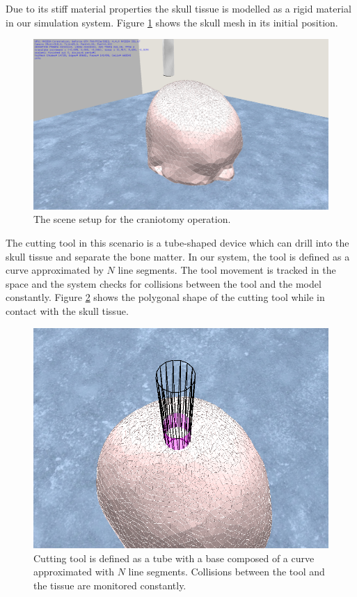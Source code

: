 Due to its stiff material properties the skull tissue is modelled as a rigid material in our simulation system. 
Figure \ref{fig:craniotomy01} shows the skull mesh in its initial position.

\begin{figure}[H]
  \centering
  \includegraphics[width=0.7\linewidth]{figures/evaluation/craniotomy01.png}
  \caption{\label{fig:craniotomy01}
  {The scene setup for the craniotomy operation.}
}
\end{figure}


The cutting tool in this scenario is a tube-shaped device which can drill into the skull tissue and separate the bone matter.
In our system, the tool is defined as a curve approximated by $N$ line segments. The tool movement is tracked in the space 
and the system checks for collisions between the tool and the model constantly. Figure \ref{fig:craniotomytube} shows the 
polygonal shape of the cutting tool while in contact with the skull tissue.

\begin{figure}[H]
  \centering
  \includegraphics[width=0.6\linewidth]{figures/evaluation/craniotomytube.png}
  \caption{\label{fig:craniotomytube}
  {Cutting tool is defined as a tube with a base composed of a curve approximated with $N$ line segments. 
  Collisions between the tool and the tissue are monitored constantly.}
}
\end{figure}

